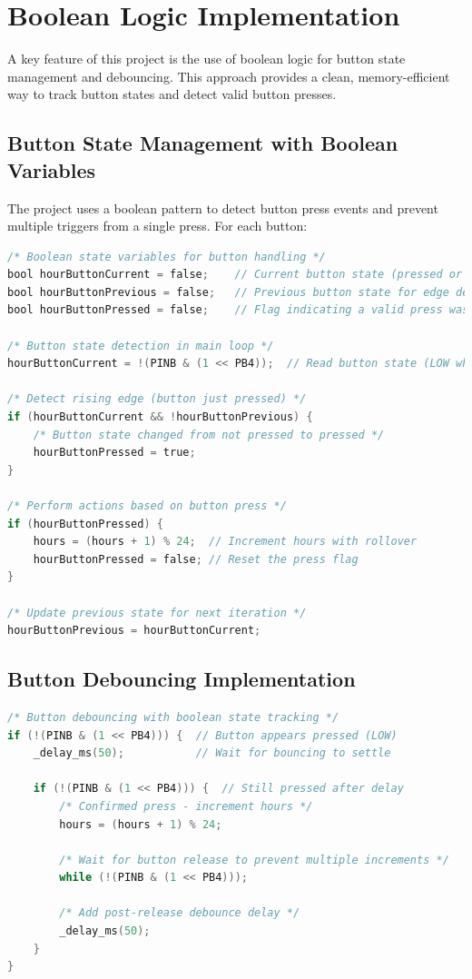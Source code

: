 \documentclass{article}
\begin{document}
\section{Boolean Logic Implementation}
A key feature of this project is the use of boolean logic for button state management and debouncing. This approach provides a clean, memory-efficient way to track button states and detect valid button presses.

\subsection{Button State Management with Boolean Variables}
The project uses a boolean pattern to detect button press events and prevent multiple triggers from a single press. For each button:

\begin{lstlisting}[language=C]
/* Boolean state variables for button handling */
bool hourButtonCurrent = false;    // Current button state (pressed or not)
bool hourButtonPrevious = false;   // Previous button state for edge detection
bool hourButtonPressed = false;    // Flag indicating a valid press was detected

/* Button state detection in main loop */
hourButtonCurrent = !(PINB & (1 << PB4));  // Read button state (LOW when pressed)

/* Detect rising edge (button just pressed) */
if (hourButtonCurrent && !hourButtonPrevious) {
    /* Button state changed from not pressed to pressed */
    hourButtonPressed = true;
}

/* Perform actions based on button press */
if (hourButtonPressed) {
    hours = (hours + 1) % 24;  // Increment hours with rollover
    hourButtonPressed = false; // Reset the press flag
}

/* Update previous state for next iteration */
hourButtonPrevious = hourButtonCurrent;
\end{lstlisting}

\subsection{Button Debouncing Implementation}
\begin{lstlisting}[language=C]
/* Button debouncing with boolean state tracking */
if (!(PINB & (1 << PB4))) {  // Button appears pressed (LOW)
    _delay_ms(50);           // Wait for bouncing to settle
    
    if (!(PINB & (1 << PB4))) {  // Still pressed after delay
        /* Confirmed press - increment hours */
        hours = (hours + 1) % 24;
        
        /* Wait for button release to prevent multiple increments */
        while (!(PINB & (1 << PB4)));
        
        /* Add post-release debounce delay */
        _delay_ms(50);
    }
}
\end{lstlisting}
\end{document}
